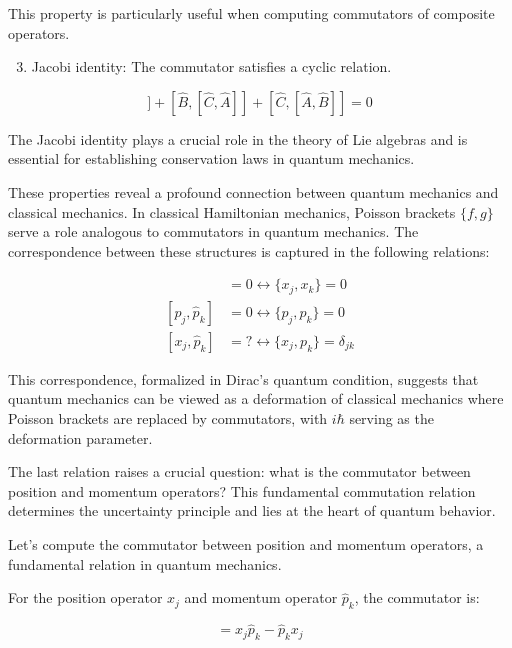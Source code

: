 This property is particularly useful when computing commutators of composite operators.

\begin{enumerate}
  \setcounter{enumi}{2}
  \item Jacobi identity: The commutator satisfies a cyclic relation.
\end{enumerate}

\begin{equation}
[\hat{A},[\hat{B}, \hat{C}]] + [\hat{B},[\hat{C}, \hat{A}]] + [\hat{C},[\hat{A}, \hat{B}]] = 0
\end{equation}

The Jacobi identity plays a crucial role in the theory of Lie algebras and is essential for establishing conservation laws in quantum mechanics.

These properties reveal a profound connection between quantum mechanics and classical mechanics. In classical Hamiltonian mechanics, Poisson brackets $\{f,g\}$ serve a role analogous to commutators in quantum mechanics. The correspondence between these structures is captured in the following relations:

\begin{align}
[x_{j}, x_{k}] &= 0 \longleftrightarrow \{x_{j}, x_{k}\} = 0 \\
[\hat{p}_{j}, \hat{p}_{k}] &= 0 \longleftrightarrow \{p_{j}, p_{k}\} = 0  \\
[x_{j}, \hat{p}_{k}] &= ? \longleftrightarrow \{x_{j}, p_{k}\} = \delta_{j k}
\end{align}

This correspondence, formalized in Dirac's quantum condition, suggests that quantum mechanics can be viewed as a deformation of classical mechanics where Poisson brackets are replaced by commutators, with $i\hbar$ serving as the deformation parameter.

The last relation raises a crucial question: what is the commutator between position and momentum operators? This fundamental commutation relation determines the uncertainty principle and lies at the heart of quantum behavior.


Let's compute the commutator between position and momentum operators, a fundamental relation in quantum mechanics.

For the position operator $x_j$ and momentum operator $\hat{p}_k$, the commutator is:

\begin{equation}
[x_j, \hat{p}_k] = x_j\hat{p}_k - \hat{p}_k x_j
\end{equation}

